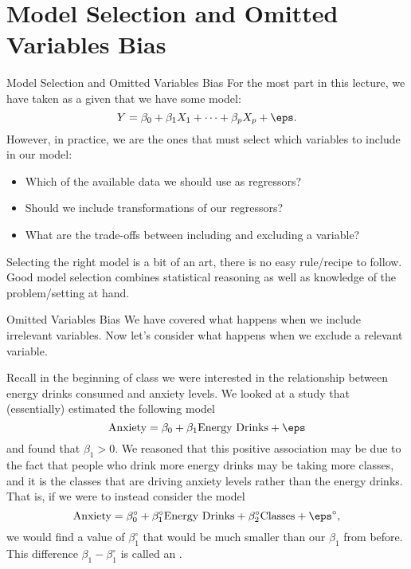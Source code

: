 \documentclass[notheorems, 9pt, handout]{beamer}
\begin{document}
\section{Model Selection and Omitted Variables Bias}%
\begin{frame}{Model Selection and Omitted Variables Bias} %
	\label{frame:mht24} %
	For the most part in this lecture, we have taken as a given that we have some model:
	\[
	    Y= \beta_0 + \beta_1X_1 + \dots+\beta_pX_p + \eps
	.\] 
	\onslide<2->
	However, in practice, we are the ones that must select which variables to include in our model:
	\begin{itemize}
		\item Which of the available data we should use as regressors?
		\item Should we include transformations of our regressors?
		\item What are the trade-offs between including and excluding a variable?
	\end{itemize}
	Selecting the right model is a bit of an art, there is no easy rule/recipe to follow. Good model selection combines statistical reasoning as well as knowledge of the problem/setting at hand.
\end{frame}

\begin{frame}{Omitted Variables Bias} %
	\label{frame:omitted1} %
	We have covered what happens when we include irrelevant variables. Now let's consider what happens when we exclude a relevant variable.

	Recall in the beginning of class we were interested in the relationship between energy drinks consumed and anxiety levels. We looked at a study that (essentially) estimated the following model
	\[
		\text{Anxiety} = \beta_0 + \beta_1\text{Energy Drinks} + \eps
	\]
	and found that \(\beta_1 > 0\). We reasoned that this positive association may be due to the fact that people who drink more energy drinks may be taking more classes, and it is the classes that are driving anxiety levels rather than the energy drinks. That is, if we were to instead consider the model
	\[
		\text{Anxiety} = \beta_0^\circ + \beta_1^\circ\text{Energy Drinks} + \beta_2^\circ\text{Classes} + \eps^\circ
	,\]
	we would find a value of \(\beta_1^\circ\) that would be much smaller than our \(\beta_1\) from before. This difference  \(\beta_1 - \beta_1^\circ\) is called an .
\end{frame}
\end{document}
